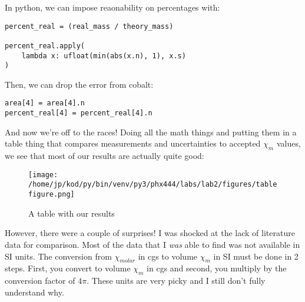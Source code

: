 \documentclass{article}
\begin{document}
In python, we can impose reaonability on percentages with: 

\begin{center}
\begin{minipage}[t]{.75\textwidth}
\begin{lstlisting}[frame=tlrb]
percent_real = (real_mass / theory_mass)

percent_real.apply(
    lambda x: ufloat(min(abs(x.n), 1), x.s)
)
\end{lstlisting}
\end{minipage}
\end{center}

Then, we can drop the error from cobalt:

\begin{center}
\begin{minipage}[t]{.75\textwidth}
\begin{lstlisting}[frame=tlrb]
area[4] = area[4].n
percent_real[4] = percent_real[4].n
\end{lstlisting}
\end{minipage}
\end{center}

And now we're off to the races! Doing all the math things and putting them in a
table thing that compares measurements and uncertainties to accepted $\chi_m$
values, we see that most of our results are actually quite good:

\begin{figure}[H]
        \begin{center}
        \texttt{[image: /home/jp/kod/py/bin/venv/py3/phx444/labs/lab2/figures/tablefigure.png]}
        \caption{A table with our results}
        \label{fig:fig_4}
        \end{center}
\end{figure}

However, there were a couple of surprises! I was shocked at the lack
of literature data for comparison. Most of the data that I \textit{was} able to
find was not available in SI units. The conversion from $\chi_{molar}$ in cgs
to volume $\chi_m$ in SI must be done in 2 steps. First, you convert to volume
$\chi_m$ in cgs and second, you multiply by the conversion factor of $4 \pi$.
These units are very picky and I still don't fully understand why.
\end{document}
